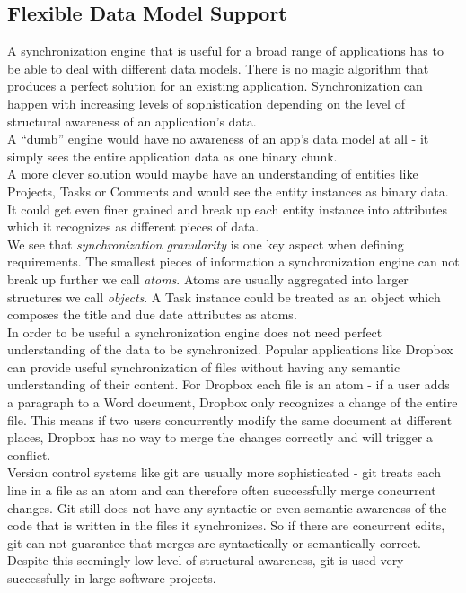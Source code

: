 \subsection{Flexible Data Model Support}
A synchronization engine that is useful for a broad range of applications has to be able to deal with different data models. There is no magic algorithm that produces a perfect solution for an existing application.
Synchronization can happen with increasing levels of sophistication depending on the level of structural awareness of an application's data.\\
A ``dumb'' engine would have no awareness of an app's data model at all - it simply sees the entire application data as one binary chunk.\\
A more clever solution would maybe have an understanding of entities like Projects, Tasks or Comments and would see the entity instances as binary data.\\
It could get even finer grained and break up each entity instance into attributes which it recognizes as different pieces of data.\\
We see that \emph{synchronization granularity} is one key aspect when defining requirements.
The smallest pieces of information a synchronization engine can not break up further we call \emph{atoms}.
Atoms are usually aggregated into larger structures we call \emph{objects}.
A Task instance could be treated as an object which composes the title and due date attributes as atoms.\\
In order to be useful a synchronization engine does not need perfect understanding of the data to be synchronized.
Popular applications like Dropbox can provide useful synchronization of files without having any semantic understanding of their content.
For Dropbox each file is an atom - if a user adds a paragraph to a Word document, Dropbox only recognizes a change of the entire file.
This means if two users concurrently modify the same document at different places, Dropbox has no way to merge the changes correctly and will trigger a conflict.\\
Version control systems like git are usually more sophisticated - git treats each line in a file as an atom and can therefore often successfully merge concurrent changes.
Git still does not have any syntactic or even semantic awareness of the code that is written in the files it synchronizes.
So if there are concurrent edits, git can not guarantee that merges are syntactically or semantically correct.
Despite this seemingly low level of structural awareness, git is used very successfully in large software projects.\\

